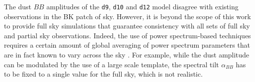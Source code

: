 \documentclass[twocolumn]{aastex631}
\begin{document}

The dust $BB$ amplitudes of the \texttt{d9}, \texttt{d10} and \texttt{d12} model disagree with existing observations in the BK patch of sky. However, it is beyond the scope of this work to provide full sky simulations that guarantee consistency with all sets of full sky and partial sky observations. Indeed, the use of power spectrum-based techniques requires a certain amount of global averaging of power spectrum parameters that are in fact known to vary across the sky \citep{planck2016-l04}. For example, while the dust amplitude can be modulated by the use of a large scale template, the spectral tilt $\alpha_{BB}$ has to be fixed to a single value for the full sky, which is not realistic.

\end{document}
